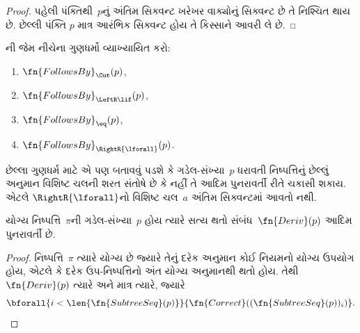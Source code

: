 \begin{proof}
પહેલી પંક્તિથી~$p$નું અંતિમ સિક્વન્ટ
ખરેખર વાક્યોનું સિક્વન્ટ છે
તે નિશ્ચિત થાય છે. છેલ્લી પંક્તિ
$p$ માત્ર આરંભિક સિક્વન્ટ હોય તે
કિસ્સાને આવરી લે છે.
\end{proof}

\begin{prob}
  ની
  જેમ નીચેના ગુણધર્મો વ્યાખ્યાયિત કરો:
  \begin{enumerate}
  \item $\fn{FollowsBy}_{\Cut}(p)$,
  \item $\fn{FollowsBy}_{\LeftR\lif}(p)$,
  \item $\fn{FollowsBy}_{\eq}(p)$,
  \item $\fn{FollowsBy}_{\RightR{\lforall}}(p)$.
  \end{enumerate}
  છેલ્લા ગુણધર્મ માટે એ પણ બતાવવું પડશે
  કે ગડેલ-સંખ્યા~$p$ ધરાવતી
  નિષ્પત્તિનું છેલ્લું અનુમાન
  વિશિષ્ટ ચલની શરત સંતોષે છે કે નહીં
  તે આદિમ પુનરાવર્તી રીતે ચકાસી શકાય.
  એટલે $\RightR{\lforall}$નો વિશિષ્ટ
  ચલ~$a$ અંતિમ સિક્વન્ટમાં આવતો નથી.
  \end{prob}
  

\begin{prop}
  યોગ્ય નિષ્પત્તિ~$\pi$ની
  ગડેલ-સંખ્યા~$p$ હોય ત્યારે સત્ય
  થતો સંબંધ~$\fn{Deriv}(p)$ આદિમ
  પુનરાવર્તી છે.
\end{prop}

\begin{proof}
  નિષ્પત્તિ~$\pi$ ત્યારે યોગ્ય
  છે જ્યારે તેનું દરેક અનુમાન કોઈ
  નિયમનો યોગ્ય ઉપયોગ હોય, એટલે કે
  દરેક ઉપ-નિષ્પત્તિનો અંત યોગ્ય
  અનુમાનથી થતો હોય. તેથી
  $\fn{Deriv}(p)$ ત્યારે અને માત્ર ત્યારે,
  જ્યારે
  \[
  \bforall{i<\len{\fn{SubtreeSeq}(p)}}{\fn{Correct}((\fn{SubtreeSeq}(p))_i)}.
  \]
\end{proof}


